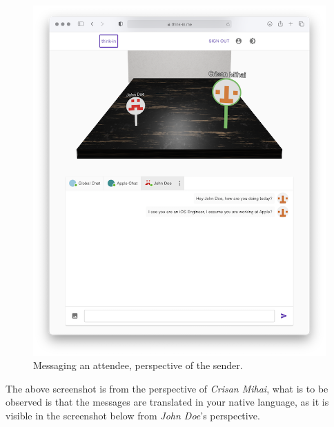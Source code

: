 \begin{figure}[H]
	\includegraphics[width=\textwidth,keepaspectratio]{images/business_logic/main_page_signed_in_chat.png}
	\caption{Messaging an attendee, perspective of the sender.}
	\label{figure:website-attendee-messaging-sender}
\end{figure}

The above screenshot is from the perspective of \textit{Crisan Mihai}, what is to be observed is that the messages are translated in your native language, as it is visible in the screenshot below from \textit{John Doe}'s perspective.

